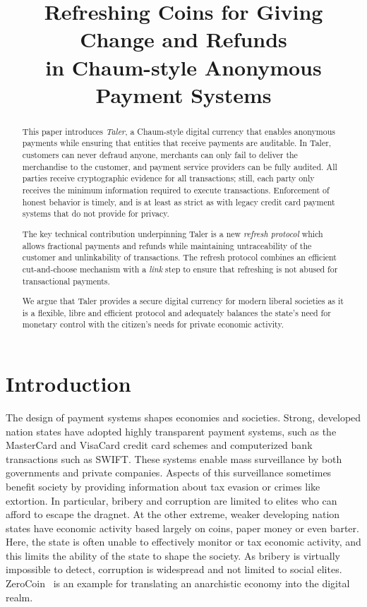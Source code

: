 \documentclass{llncs}
\title{Refreshing Coins for Giving Change and Refunds \\ in Chaum-style Anonymous Payment Systems}
\begin{document}
\mainmatter



\maketitle

\begin{abstract}
This paper introduces {\em Taler}, a Chaum-style digital currency that
enables anonymous payments while ensuring that entities that receive
payments are auditable.  In Taler, customers can
never defraud anyone, merchants can only fail to deliver the
merchandise to the customer, and payment service providers can be
fully audited.  All parties receive cryptographic evidence for all
transactions; still, each party only receives the minimum information
required to execute transactions.  Enforcement of honest behavior is
timely, and is at least as strict as with legacy credit card payment
systems that do not provide for privacy.

The key technical contribution underpinning Taler is a new {\em
  refresh protocol} which allows fractional payments and refunds while
maintaining untraceability of the customer and unlinkability of
transactions.  The refresh protocol combines an
efficient cut-and-choose mechanism with a {\em link} step to ensure
that refreshing is not abused for transactional payments.

We argue that Taler provides a secure digital currency for modern
liberal societies as it is a flexible, libre and efficient protocol
and adequately balances the state's need for monetary control with the
citizen's needs for private economic activity.
\end{abstract}

\section{Introduction}

The design of payment systems shapes economies and societies.  Strong,
developed nation states have adopted highly transparent payment systems,
such as the MasterCard and VisaCard credit card schemes and computerized
bank transactions such as SWIFT.  These systems enable mass surveillance
by both governments and private companies.  Aspects of this surveillance
sometimes benefit society by providing information about tax evasion or
crimes like extortion.  %
In particular, bribery and corruption are limited to elites who can
afford to escape the dragnet.
%
At the other extreme, weaker developing nation states have economic
activity based largely on coins, paper money or even barter.  Here,
the state is often unable to effectively monitor or tax economic
activity, and this limits the ability of the state to shape the
society.  As bribery is virtually impossible to detect, corruption is
widespread and not limited to social elites.
%
ZeroCoin~\cite{miers2013zerocoin} is an example for translating an
anarchistic economy into the digital realm.
\end{document}
